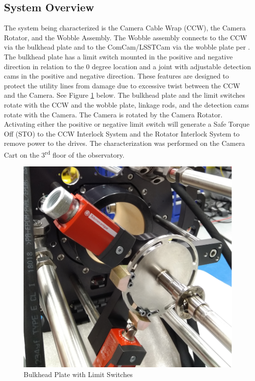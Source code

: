 \documentclass[SE,lsstdraft,authoryear,toc]{lsstdoc}
\begin{document}
\subsection{System Overview}
The system being characterized is the Camera Cable Wrap (CCW), the Camera Rotator, and the Wobble Assembly. The Wobble assembly connects to the CCW via the bulkhead plate and to the ComCam/LSSTCam via the wobble plate per . The bulkhead plate has a limit switch mounted in the positive and negative direction in relation to the 0 degree location and a joint with adjustable detection cams in the positive and negative direction. These features are designed to protect the utility lines from damage due to excessive twist between the CCW and the Camera. See Figure \ref{fig:Figure_1} below. The bulkhead plate and the limit switches rotate with the CCW and the wobble plate, linkage rods, and the detection cams rotate with the Camera. The Camera is rotated by the Camera Rotator. Activating either the positive or negative limit switch will generate a Safe Torque Off (STO) to the CCW Interlock System and the Rotator Interlock System to remove power to the drives. The characterization was performed on the Camera Cart on the 3\textsuperscript{rd} floor of the observatory.

\begin{figure}[h!]
  \includegraphics[width=\linewidth]{media/Figure_1.png}
  \caption{Bulkhead Plate with Limit Switches}
  \label{fig:Figure_1}
\end{figure}
\end{document}
